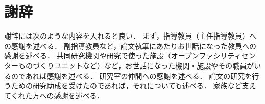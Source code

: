\section*{謝辞}

謝辞には次のような内容を入れると良い．
まず，指導教員（主任指導教員）への感謝を述べる．
副指導教員など，論文執筆にあたりお世話になった教員への感謝を述べる．
共同研究機関や研究で使った施設（オープンファシリティセンターものづくりユニットなど）など，お世話になった機関・施設やその職員がいるのであれば感謝を述べる．
研究室の仲間への感謝を述べる．
論文の研究を行うための研究助成を受けたのであれば，それについても述べる．
家族など支えてくれた方への感謝を述べる．


\clearpage